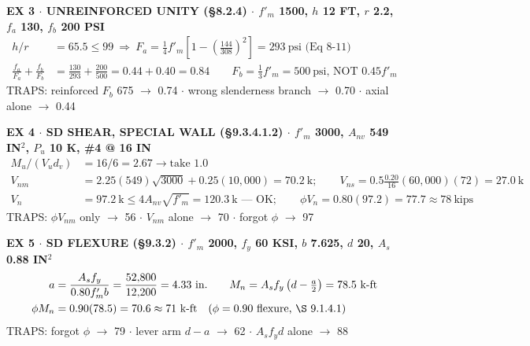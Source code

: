 \documentclass[10pt]{article}
\begin{document}
\medskip
{\ttfamily\footnotesize\bfseries EX 3 $\cdot$ UNREINFORCED UNITY (\S 8.2.4) $\cdot$ $f'_m$ 1500, $h$ 12 FT, $r$ 2.2, $f_a$ 130, $f_b$ 200 PSI}
\begin{align*}
h/r &= 65.5 \le 99 \ \Rightarrow\ F_a = \tfrac{1}{4}f'_m\left[1 - \left(\tfrac{144}{308}\right)^2\right] = 293\ \text{psi (Eq 8-11)}\\
\tfrac{f_a}{F_a} + \tfrac{f_b}{F_b} &= \tfrac{130}{293} + \tfrac{200}{500} = 0.44 + 0.40 = 0.84 \qquad F_b = \tfrac{1}{3}f'_m = 500\ \text{psi, NOT } 0.45f'_m
\end{align*}
{\ttfamily\footnotesize TRAPS: reinforced $F_b$ 675 $\to$ 0.74 $\cdot$ wrong slenderness branch $\to$ 0.70 $\cdot$ axial alone $\to$ 0.44}

\medskip
{\ttfamily\footnotesize\bfseries EX 4 $\cdot$ SD SHEAR, SPECIAL WALL (\S 9.3.4.1.2) $\cdot$ $f'_m$ 3000, $A_{nv}$ 549 IN$^2$, $P_u$ 10 K, \#4 @ 16 IN}
\begin{align*}
M_u/(V_u d_v) &= 16/6 = 2.67 \to \text{take } 1.0\\
V_{nm} &= 2.25(549)\sqrt{3000} + 0.25(10{,}000) = 70.2\ \text{k};\qquad V_{ns} = 0.5\tfrac{0.20}{16}(60{,}000)(72) = 27.0\ \text{k}\\
V_n &= 97.2\ \text{k} \le 4A_{nv}\sqrt{f'_m} = 120.3\ \text{k — OK};\qquad \phi V_n = 0.80(97.2) = 77.7 \approx 78\ \text{kips}
\end{align*}
{\ttfamily\footnotesize TRAPS: $\phi V_{nm}$ only $\to$ 56 $\cdot$ $V_{nm}$ alone $\to$ 70 $\cdot$ forgot $\phi$ $\to$ 97}

\medskip
{\ttfamily\footnotesize\bfseries EX 5 $\cdot$ SD FLEXURE (\S 9.3.2) $\cdot$ $f'_m$ 2000, $f_y$ 60 KSI, $b$ 7.625, $d$ 20, $A_s$ 0.88 IN$^2$}
\begin{align*}
a &= \frac{A_s f_y}{0.80 f'_m b} = \frac{52{,}800}{12{,}200} = 4.33\ \text{in.}\qquad M_n = A_s f_y\left(d - \tfrac{a}{2}\right) = 78.5\ \text{k-ft}\\
\phi M_n &= 0.90(78.5) = 70.6 \approx 71\ \text{k-ft} \quad (\phi = 0.90\ \text{flexure, \S 9.1.4.1})
\end{align*}
{\ttfamily\footnotesize TRAPS: forgot $\phi$ $\to$ 79 $\cdot$ lever arm $d-a$ $\to$ 62 $\cdot$ $A_s f_y d$ alone $\to$ 88}
\end{document}
